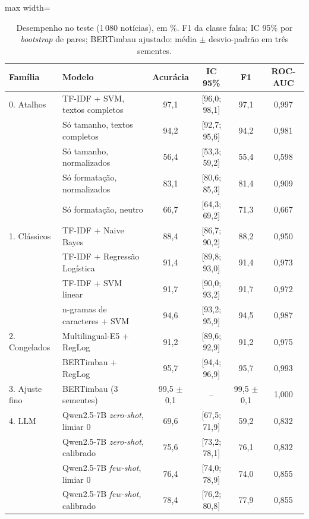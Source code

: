 \begin{table}[t]
\centering\small
\begin{adjustbox}{max width=\textwidth}
\begin{tabular}{llcccc}
\toprule
Família & Modelo & Acurácia & IC 95\% & F1 & ROC-AUC \\
\midrule
0. Atalhos & TF-IDF + SVM, textos completos & 97,1 & [96,0; 98,1] & 97,1 & 0,997 \\
 & Só tamanho, textos completos & 94,2 & [92,7; 95,6] & 94,2 & 0,981 \\
 & Só tamanho, normalizados & 56,4 & [53,3; 59,2] & 55,4 & 0,598 \\
 & Só formatação, normalizados & 83,1 & [80,6; 85,3] & 81,4 & 0,909 \\
 & Só formatação, neutro & 66,7 & [64,3; 69,2] & 71,3 & 0,667 \\
\midrule
1. Clássicos & TF-IDF + Naive Bayes & 88,4 & [86,7; 90,2] & 88,2 & 0,950 \\
 & TF-IDF + Regressão Logística & 91,4 & [89,8; 93,0] & 91,4 & 0,973 \\
 & TF-IDF + SVM linear & 91,7 & [90,0; 93,2] & 91,7 & 0,972 \\
 & n-gramas de caracteres + SVM & 94,6 & [93,2; 95,9] & 94,5 & 0,987 \\
\midrule
2. Congelados & Multilingual-E5 + RegLog & 91,2 & [89,6; 92,9] & 91,2 & 0,975 \\
 & BERTimbau + RegLog & 95,7 & [94,4; 96,9] & 95,7 & 0,993 \\
\midrule
3. Ajuste fino & BERTimbau (3 sementes) & 99,5 $\pm$ 0,1 & -- & 99,5 $\pm$ 0,1 & 1,000 \\
\midrule
4. LLM & Qwen2.5-7B \emph{zero-shot}, limiar 0 & 69,6 & [67,5; 71,9] & 59,2 & 0,832 \\
 & Qwen2.5-7B \emph{zero-shot}, calibrado & 75,6 & [73,2; 78,1] & 76,1 & 0,832 \\
 & Qwen2.5-7B \emph{few-shot}, limiar 0 & 76,4 & [74,0; 78,9] & 74,0 & 0,855 \\
 & Qwen2.5-7B \emph{few-shot}, calibrado & 78,4 & [76,2; 80,8] & 77,9 & 0,855 \\
\bottomrule
\end{tabular}
\end{adjustbox}
\caption{Desempenho no teste (1\,080 notícias), em \%. F1 da classe falsa; IC 95\% por \emph{bootstrap} de pares; BERTimbau ajustado: média $\pm$ desvio-padrão em três sementes.}
\label{tab:resultados}
\end{table}

